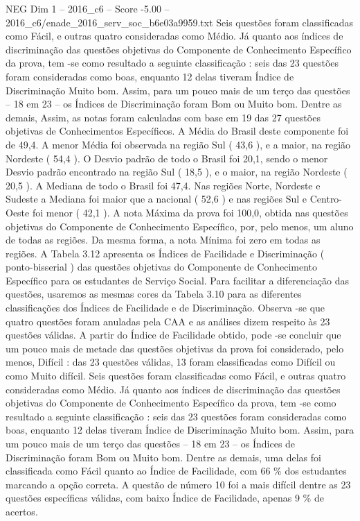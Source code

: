 \begin{textsample}{NEG Dim 1 – 2016\_c6 – Score -5.00 – 2016\_c6/enade\_2016\_serv\_soc\_b6e03a9959.txt}
Seis questões foram classificadas como Fácil, e outras quatro consideradas como Médio.
Já quanto aos índices de discriminação das questões objetivas do Componente de Conhecimento Específico da prova, tem -se como resultado a seguinte classificação : seis das 23 questões foram consideradas como boas, enquanto 12 delas tiveram Índice de Discriminação Muito bom.
Assim, para um pouco mais de um terço das questões – 18 em 23 – os Índices de Discriminação foram Bom ou Muito bom.
Dentre as demais, Assim, as notas foram calculadas com base em 19 das 27 questões objetivas de Conhecimentos Específicos.
A Média do Brasil deste componente foi de 49,4.
A menor Média foi observada na região Sul ( 43,6 ), e a maior, na região Nordeste ( 54,4 ).
O Desvio padrão de todo o Brasil foi 20,1, sendo o menor Desvio padrão encontrado na região Sul ( 18,5 ), e o maior, na região Nordeste ( 20,5 ).
A Mediana de todo o Brasil foi 47,4.
Nas regiões Norte, Nordeste e Sudeste a Mediana foi maior que a nacional ( 52,6 ) e nas regiões Sul e Centro-Oeste foi menor ( 42,1 ).
A nota Máxima da prova foi 100,0, obtida nas questões objetivas do Componente de Conhecimento Específico, por, pelo menos, um aluno de todas as regiões.
Da mesma forma, a nota Mínima foi zero em todas as regiões.
A Tabela 3.12 apresenta os Índices de Facilidade e Discriminação ( ponto-bisserial ) das questões objetivas do Componente de Conhecimento Específico para os estudantes de Serviço Social.
Para facilitar a diferenciação das questões, usaremos as mesmas cores da Tabela 3.10 para as diferentes classificações dos Índices de Facilidade e de Discriminação.
Observa -se que quatro questões foram anuladas pela CAA e as análises dizem respeito às 23 questões válidas.
A partir do Índice de Facilidade obtido, pode -se concluir que um pouco mais de metade das questões objetivas da prova foi considerado, pelo menos, Difícil : das 23 questões válidas, 13 foram classificadas como Difícil ou como Muito difícil.
Seis questões foram classificadas como Fácil, e outras quatro consideradas como Médio.
Já quanto aos índices de discriminação das questões objetivas do Componente de Conhecimento Específico da prova, tem -se como resultado a seguinte classificação : seis das 23 questões foram consideradas como boas, enquanto 12 delas tiveram Índice de Discriminação Muito bom.
Assim, para um pouco mais de um terço das questões – 18 em 23 – os Índices de Discriminação foram Bom ou Muito bom.
Dentre as demais, uma delas foi classificada como Fácil quanto ao Índice de Facilidade, com 66 \% dos estudantes marcando a opção correta.
A questão de número 10 foi a mais difícil dentre as 23 questões específicas válidas, com baixo Índice de Facilidade, apenas 9 \% de acertos.

\end{textsample}
